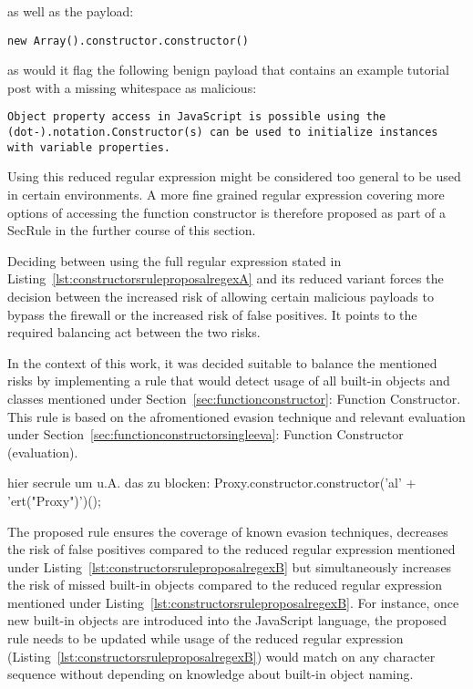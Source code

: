 as well as the payload:

\begin{lstlisting}[style=basicStyle]
new Array().constructor.constructor()
\end{lstlisting}

as would it flag the following benign payload that contains an example tutorial post with a missing whitespace as malicious:
\begin{lstlisting}[style=basicStyle]
Object property access in JavaScript is possible using the (dot-).notation.Constructor(s) can be used to initialize instances with variable properties.
\end{lstlisting}
Using this reduced regular expression might be considered too general to be used in certain environments. A more fine grained regular expression covering more options of accessing the function constructor is therefore proposed as part of a SecRule in the further course of this section.

Deciding between using the full regular expression stated in Listing~\ref{lst:constructorsruleproposalregexA} and its reduced variant forces the decision between the increased risk of allowing certain malicious payloads to bypass the firewall or the increased risk of false positives. It points to the required balancing act between the two risks.

In the context of this work, it was decided suitable to balance the mentioned risks by implementing a rule that would detect usage of all built-in objects and classes mentioned under Section~\ref{sec:functionconstructor}: Function Constructor. This rule is based on the afromentioned evasion technique and relevant evaluation under Section~\ref{sec:functionconstructorsingleeva}: Function Constructor (evaluation).

	{\color{blue}hier secrule um u.A. das zu blocken: Proxy.constructor.constructor('al' + 'ert("Proxy")')(); }


The proposed rule ensures the coverage of known evasion techniques, decreases the risk of false positives compared to the reduced regular expression mentioned under Listing~\ref{lst:constructorsruleproposalregexB} but simultaneously increases the risk of missed built-in objects compared to the reduced regular expression mentioned under Listing~\ref{lst:constructorsruleproposalregexB}. For instance, once new built-in objects are introduced into the JavaScript language, the proposed rule needs to be updated while usage of the reduced regular expression (Listing~\ref{lst:constructorsruleproposalregexB}) would match on any character sequence without depending on knowledge about built-in object naming.




